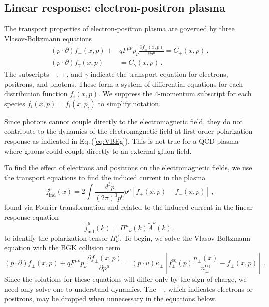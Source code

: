 \subsection{Linear response: electron-positron plasma}
The transport properties of electron-positron plasma are governed by three Vlasov-Boltzmann equations \cite{Grayson:2023flr}
\begin{align}\label{eq:VBEf}
(p \cdot \partial) f_\pm(x,p) + &q F^{\mu\nu} p_\nu \frac{\partial f_\pm(x,p)}{\partial p^\mu} = C_\pm(x,p)\,,\\
\label{eq:VBEg}(p \cdot \partial) f_\gamma(x,p) &= C_\gamma(x,p)\,.
\end{align}
The subscripts $-$, $+$, and $\gamma$ indicate the transport equation for electrons, positrons, and photons. These form a system of differential equations for each distribution function $f_i(x,p)$. We suppress the 4-momentum subscript for each species $f_i(x,p) = f_i(x,p_i)$ to simplify notation. 

Since photons cannot couple directly to the electromagnetic field, they do not contribute to the dynamics of the electromagnetic field at first-order polarization response as indicated in Eq.\,(\ref{eq:VBEg}). This is not true for a QCD plasma where gluons could couple directly to an external gluon field.

To find the effect of electrons and positrons on the electromagnetic fields, we use the transport equations  to find the induced current in the plasma
\begin{equation}
j_{\mathrm{ind}}^\mu(x) = 2\int \frac{d^3 p}{(2 \pi)^3 p^0}p^\mu \left[f_+(x,p)-f_-(x,p)\right]\,,
\end{equation}
found via Fourier transformation and related to the induced current in the linear response equation
\begin{equation}
    \widetilde{j}_{\mathrm{ind}}^{\mu}(k) = {\Pi^{\mu}}_{\nu}(k) \widetilde{A}^{\nu}(k)\,,
\end{equation}
to identify the polarization tensor $\Pi^{\mu}_{\nu}$. To begin, we solve the Vlasov-Boltzmann equation with the BGK collision term
\begin{equation}\label{eq:boltzmanncov}
(p \cdot \partial) f_\pm(x,p) + q F^{\mu\nu} p_\nu \frac{\partial f_\pm(x,p)}{\partial p^\mu} = (p \cdot u)\kappa_\pm\left[f^\mathrm{eq}_\pm(p)\frac{n_\pm(x)}{n^\mathrm{eq}_\pm} - f_\pm(x,p)\right]\,.
\end{equation}
Since the solutions for these equations will differ only by the sign of charge, we need only solve one to understand dynamics. The $\pm$, which indicates electrons or positrons, may be dropped when unnecessary in the equations below.

